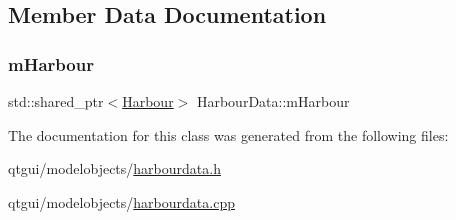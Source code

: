 \subsection{Member Data Documentation}
\mbox{\label{class_harbour_data_a035af9a2d8f393581d9376b136ef0136}} 
\subsubsection{\texorpdfstring{mHarbour}{mHarbour}}
{\footnotesize\ttfamily std\+::shared\+\_\+ptr$<$\mbox{\hyperlink{class_harbour}{Harbour}}$>$ Harbour\+Data\+::m\+Harbour}



The documentation for this class was generated from the following files\+:\begin{DoxyCompactItemize}
\item 
qtgui/modelobjects/\mbox{\hyperlink{harbourdata_8h}{harbourdata.\+h}}\item 
qtgui/modelobjects/\mbox{\hyperlink{harbourdata_8cpp}{harbourdata.\+cpp}}\end{DoxyCompactItemize}
